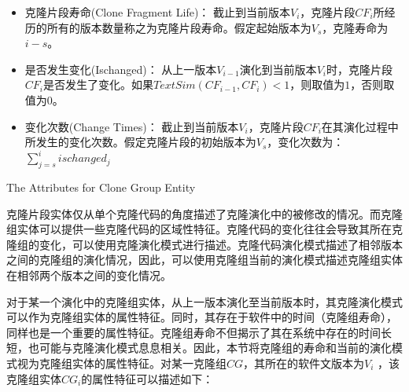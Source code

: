 \begin{itemize}
\item
克隆片段寿命(Clone Fragment Life)：
截止到当前版本$V_ i $，克隆片段$CF_i$所经历的所有的版本数量称之为克隆片段寿命。假定起始版本为$V_s$，克隆寿命为$i - s$。
\item
是否发生变化(Ischanged)：
从上一版本$V_{i-1} $演化到当前版本$V_ i $时，克隆片段$CF_i$是否发生了变化。如果$\mathit{TextSim}(CF_{i-1}, CF_{i}) < 1$，则取值为$1$，否则取值为$0$。
\item
变化次数(Change Times)：
截止到当前版本$V_ i $，克隆片段$CF_i$在其演化过程中所发生的变化次数。假定克隆片段的初始版本为$V_s$，变化次数为：$\sum_{j=s}^i{ischanged_j}$
\end{itemize}

{The Attributes for Clone Group Entity}

克隆片段实体仅从单个克隆代码的角度描述了克隆演化中的被修改的情况。而克隆组实体可以提供一些克隆代码的区域性特征。克隆代码的变化往往会导致其所在克隆组的变化，可以使用克隆演化模式进行描述。克隆代码演化模式描述了相邻版本之间的克隆组的演化情况，因此，可以使用克隆组当前的演化模式描述克隆组实体在相邻两个版本之间的变化情况。

对于某一个演化中的克隆组实体，从上一版本演化至当前版本时，其克隆演化模式可以作为克隆组实体的属性特征。同时，其存在于软件中的时间（克隆组寿命），同样也是一个重要的属性特征。克隆组寿命不但揭示了其在系统中存在的时间长短，也可能与克隆演化模式息息相关。因此，本节将克隆组的寿命和当前的演化模式视为克隆组实体的属性特征。对某一克隆组$CG$，其所在的软件文版本为$V_i $ ，该克隆组实体{$CG_i$}的属性特征可以描述如下：

